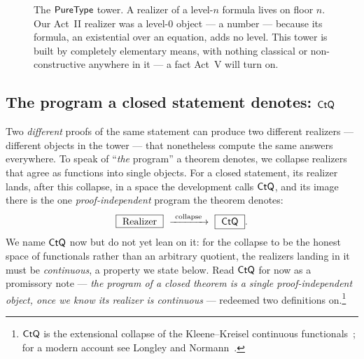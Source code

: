 \documentclass[11pt]{article}
\begin{document}
\begin{figure}[h]
\centering
{}
\caption{The $\mathsf{PureType}$ tower. A realizer of a level-$n$ formula lives on floor
$n$. Our Act~II realizer was a level-$0$ object --- a number --- because its
formula, an existential over an equation, adds no level. This tower is built
by completely elementary means, with nothing classical or non-constructive
anywhere in it --- a fact Act~V will turn on.}
\label{fig:tower}
\end{figure}

\subsection*{The program a closed statement denotes: \texorpdfstring{$\mathsf{CtQ}$}{CtQ}}

Two \emph{different} proofs of the same statement can produce two different
realizers --- different objects in the tower --- that nonetheless compute the
same answers everywhere. To speak of ``\emph{the} program'' a theorem
denotes, we collapse realizers that agree as functions into single objects.
For a closed statement, its realizer lands, after this collapse, in a space
the development calls $\mathsf{CtQ}$, and its image there is the one
\emph{proof-independent} program the theorem denotes:
\[
  \boxed{\ \text{Realizer}\ } \ \xrightarrow{\ \text{collapse}\ }\
  \boxed{\ \CtQ\ } .
\]
We name $\mathsf{CtQ}$ now but do not yet lean on it: for the collapse to be the
honest space of functionals rather than an arbitrary quotient, the realizers
landing in it must be \emph{continuous}, a property we state below. Read
$\mathsf{CtQ}$ for now as a promissory note --- \emph{the program of a closed theorem
is a single proof-independent object, once we know its realizer is
continuous} --- redeemed two definitions on.\footnote{$\mathsf{CtQ}$ is the
extensional collapse of the Kleene--Kreisel continuous
functionals~\citep{kleene1959,kreisel1959}; for a modern account see Longley
and Normann~\citep{longleynormann2015}.}
\end{document}
